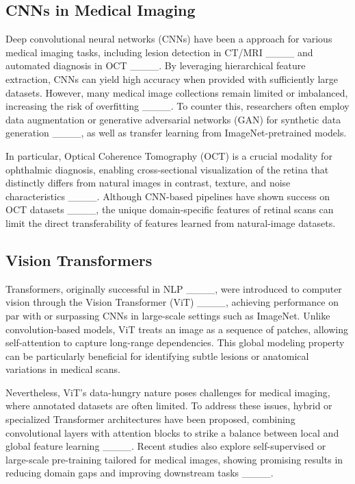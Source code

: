 	\subsection{CNNs in Medical Imaging}
	Deep convolutional neural networks (CNNs) have been a approach for various medical imaging tasks, including lesion detection in CT/MRI ____ and automated diagnosis in OCT ____. By leveraging hierarchical feature extraction, CNNs can yield high accuracy when provided with sufficiently large datasets. However, many medical image collections remain limited or imbalanced, increasing the risk of overfitting ____. To counter this, researchers often employ data augmentation or generative adversarial networks (GAN) for synthetic data generation ____, as well as transfer learning from ImageNet-pretrained models.
	
	In particular, Optical Coherence Tomography (OCT) is a crucial modality for ophthalmic diagnosis, enabling cross-sectional visualization of the retina that distinctly differs from natural images in contrast, texture, and noise characteristics ____. Although CNN-based pipelines have shown success on OCT datasets ____, the unique domain-specific features of retinal scans can limit the direct transferability of features learned from natural-image datasets.
	
	\subsection{Vision Transformers}
	Transformers, originally successful in NLP ____, were introduced to computer vision through the Vision Transformer (ViT) ____, achieving performance on par with or surpassing CNNs in large-scale settings such as ImageNet. Unlike convolution-based models, ViT treats an image as a sequence of patches, allowing self-attention to capture long-range dependencies. This global modeling property can be particularly beneficial for identifying subtle lesions or anatomical variations in medical scans. 
	
	Nevertheless, ViT’s data-hungry nature poses challenges for medical imaging, where annotated datasets are often limited. To address these issues, hybrid or specialized Transformer architectures have been proposed, combining convolutional layers with attention blocks to strike a balance between local and global feature learning ____. Recent studies also explore self-supervised or large-scale pre-training tailored for medical images, showing promising results in reducing domain gaps and improving downstream tasks ____.
	
